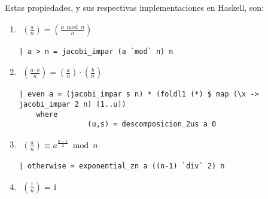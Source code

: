 \documentclass[10pt,spanish]{article}
\begin{document}
Estas propiedades, y sus respectivas implementaciones en Haskell, son:

\begin{enumerate}[1.]
\item 
\begin{equation*}
    \begin{aligned}
    \left( \frac{a}{n} \right) = \left( \frac{a \bmod n}{n} \right)
    \end{aligned}
    \phantom{\hspace{18cm}}
\end{equation*}

\begin{verbatim}
| a > n = jacobi_impar (a `mod` n) n 
\end{verbatim}

\item 
\begin{equation*}
    \begin{aligned}
    \left( \frac{a \cdot b}{n} \right) = \left( \frac{a}{n} \right) \cdot \left( \frac{b}{n} \right)
    \end{aligned}
    \phantom{\hspace{18cm}}
\end{equation*}

\begin{verbatim}
| even a = (jacobi_impar s n) * (foldl1 (*) $ map (\x -> jacobi_impar 2 n) [1..u])
    where
                (u,s) = descomposicion_2us a 0

\end{verbatim}

\item
\begin{equation*}
    \begin{aligned}
    \left( \frac{a}{n} \right) \equiv a^{\frac{n-1}{2}} \bmod n
    \end{aligned}
    \phantom{\hspace{18cm}}
\end{equation*}

\begin{verbatim}
| otherwise = exponential_zn a ((n-1) `div` 2) n
\end{verbatim}

\item
\begin{equation*}
    \begin{aligned}
    \left( \frac{1}{n} \right) = 1
    \end{aligned}
    \phantom{\hspace{18cm}}
\end{equation*}


\end{enumerate}
\end{document}
